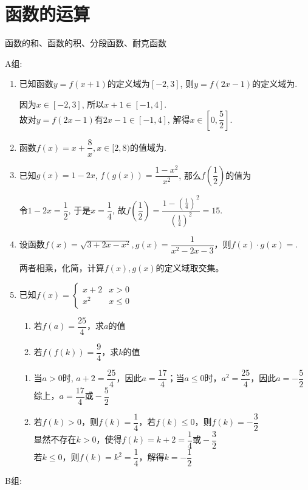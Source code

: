 \section{函数的运算}

\zsd 函数的和、函数的积、分段函数、耐克函数

A组:
\begin{enumerate}
\item 已知函数$y=f(x+1)$的定义域为$[-2,3]$, 则$y=f(2x-1)$的定义域为.
\begin{jieda}
因为$x\in[-2,3]$, 所以$x+1\in[-1,4]$.\\
故对$y=f(2x-1)$有$2x-1\in[-1,4]$, 解得$x\in\left[0,\dfrac{5}{2}\right]$.
\end{jieda} 
\item 函数$f(x) = x + \dfrac{8}{x}, x \in  [2, 8)$的值域为\blkda[2]{$[4\sqrt{2}, 9)$}. 
\item 已知$g(x)=1-2x$, $f(g(x))=\dfrac{1-x^2}{x^2}$, 那么$f\left(\dfrac{1}{2}\right)$的值为
\begin{jieda}
令$1-2x=\dfrac{1}{2}$, 于是$x=\dfrac{1}{4}$, 故$f\left(\dfrac{1}{2}\right)=\dfrac{1-(\frac{1}{4})^2}{(\frac{1}{4})^2}=15$. 
\end{jieda}
\item 设函数$f(x) = \sqrt{3+2x-x^2}, g(x) = \dfrac{1}{x^2-2x-3}$，则$f(x) \cdot g(x)=$.
\begin{jieda}
两者相乘，化简，计算$f(x), g(x)$的定义域取交集。
\end{jieda}
\item 已知$f(x) = \left \{ \begin{array}{ll}
    x+2 & x > 0 \\
    x^2 & x \leq 0
\end{array}\right.$
\begin{enumerate}
    \item 若$f(a) = \dfrac{25}{4}$，求$a$的值
    \item 若$f(f(k)) = \dfrac{9}{4}$，求$k$的值
\end{enumerate}
\begin{jieda}
\begin{enumerate}
    \item 当$a > 0$时, $a+2 = \dfrac{25}{4}$，因此$a = \dfrac{17}{4}$；当$a \leq 0$时，$a^2 = \dfrac{25}{4}$，因此$a = -\dfrac{5}{2}$ \\
    综上，$a = \dfrac{17}{4} \mbox{或} -\dfrac{5}{2}$
    \item 若$f(k) > 0$，则$f(k) = \dfrac{1}{4}$，若$f(k) \leq 0$，则$f(k) = -\dfrac{3}{2}$\\
    显然不存在$k > 0$，使得$f(k) = k+2 = \dfrac{1}{4} \mbox{或} -\dfrac{3}{2}$ \\
    若$k \leq 0$，则$f(k) = k^2 = \dfrac{1}{4}$，解得$k = -\dfrac{1}{2}$
\end{enumerate}
\end{jieda}
\begin{vspace_}
\vsp[3]
\end{vspace_}



\end{enumerate}
B组:

